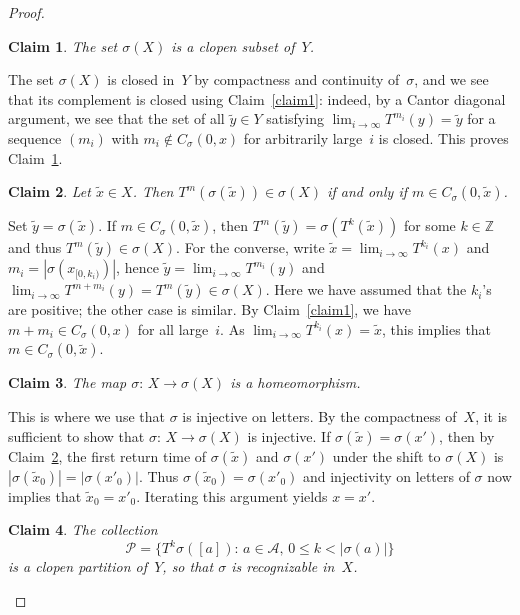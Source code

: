 \documentclass{amsart}
\newtheorem{claim}{Claim}
\theoremstyle{definition}
\theoremstyle{remark}
\numberwithin{equation}{section}
\begin{document}
\begin{proof}
\begin{claim} \label{claim2}
The set $\sigma(X)$ is a clopen subset of~$Y$.
\end{claim}

The set $\sigma(X)$ is closed in~$Y$ by compactness and continuity of~$\sigma$, and we see that its complement is closed using Claim~\ref{claim1}: indeed, by a Cantor diagonal argument, we see that the set of all $\tilde{y} \in Y$ satisfying $\lim_{i\to\infty} T^{m_i}(y) = \tilde{y}$ for a sequence $(m_i)$ with $m_i \notin C_\sigma(0,x)$ for arbitrarily large~$i$ is closed. 
This proves Claim~\ref{claim2}.


\begin{claim}\label{claim3}
Let $\tilde{x} \in X$. 
Then $T^m(\sigma(\tilde{x})) \in \sigma(X)$ if and only if $m \in C_\sigma(0,\tilde{x})$.  
\end{claim}
 
Set $\tilde{y} = \sigma(\tilde{x})$. 
If $m \in C_\sigma(0,\tilde{x})$, then $T^m(\tilde{y}) = \sigma(T^k(\tilde{x}))$ for some $k \in \mathbb{Z}$ and thus $T^m(\tilde{y}) \in \sigma(X)$.
For the converse, write $\tilde{x} = \lim_{i\to\infty} T^{k_i}(x)$ and $m_i = |\sigma(x_{[0,k_i)})|$, hence $\tilde{y} = \lim_{i\to\infty} T^{m_i}(y)$ and $\lim_{i\to\infty} T^{m+m_i}(y) = T^m(\tilde{y}) \in \sigma(X)$.
Here we have assumed that the $k_i$'s are positive; the other case is similar. 
By Claim~\ref{claim1}, we have $m + m_i \in C_\sigma(0,x)$ for all large~$i$. 
As $\lim_{i\to\infty} T^{k_i}(x) = \tilde{x}$, this implies that $m \in C_\sigma(0,\tilde{x})$. 
 
\begin{claim}\label{claim4}
The map $\sigma:\, X \to \sigma(X)$ is a homeomorphism.
\end{claim}

This is where we use that $\sigma$ is injective on letters. 
By the compactness of~$X$, it is sufficient to show that $\sigma:\, X \to \sigma(X)$ is injective. 
If $\sigma(\tilde{x}) = \sigma(x')$, then by Claim~\ref{claim3}, the first return time of $\sigma(\tilde{x})$ and $\sigma(x')$ under the shift to $\sigma(X)$ is $|\sigma(\tilde{x}_0)| = |\sigma(x'_0)|$. 
Thus $\sigma(\tilde{x}_0) = \sigma(x'_0)$ and injectivity  on letters of $\sigma$ now implies that $\tilde{x}_0 = x'_0$. Iterating this argument yields $x=x'$.

\begin{claim}\label{claim5}
The collection 
\begin{equation}\label{eq:parti}
\mathcal{P} = \{ T^k \sigma([a]):\, a \in \mathcal{A},\, 0\leq k<|\sigma(a)| \}
\end{equation}
is a clopen partition of~$Y$, so that $\sigma$ is recognizable in~$X$.
\end{claim}


\end{proof}
\end{document}
